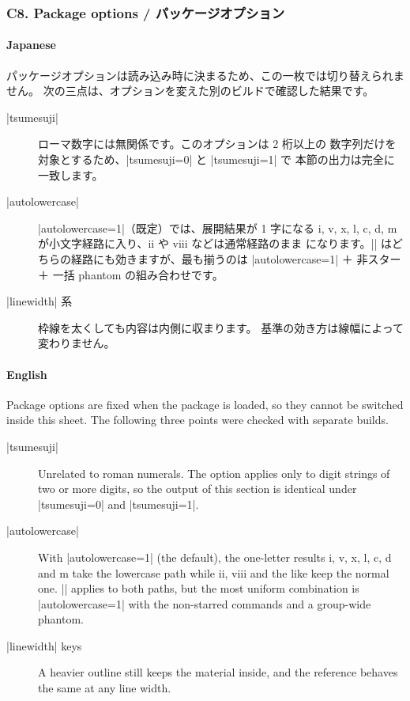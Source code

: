 \documentclass[luatex,fontsize=8pt,paper=b5,twoside]{jlreq}%
\begin{document}
\subsubsection*{C8. Package options / パッケージオプション}
\paragraph{Japanese}
パッケージオプションは読み込み時に決まるため、この一枚では切り替えられません。
次の三点は、オプションを変えた別のビルドで確認した結果です。

\begin{description}
  \item[\KKverb|tsumesuji|] ローマ数字には無関係です。このオプションは 2 桁以上の
  数字列だけを対象とするため、\KKverb|tsumesuji=0| と \KKverb|tsumesuji=1| で
  本節の出力は完全に一致します。
  \item[\KKverb|autolowercase|] \KKverb|autolowercase=1|（既定）では、展開結果が
  1 字になる i, v, x, l, c, d, m が小文字経路に入り、ii や viii などは通常経路のまま
  になります。\KKverb|\kksref| はどちらの経路にも効きますが、最も揃うのは
  \KKverb|autolowercase=1| ＋ 非スター ＋ 一括 phantom の組み合わせです。
  \item[\KKverb|linewidth| 系] 枠線を太くしても内容は内側に収まります。
  基準の効き方は線幅によって変わりません。
\end{description}

\paragraph{English}
Package options are fixed when the package is loaded, so they cannot be switched
inside this sheet. The following three points were checked with separate builds.

\begin{description}
  \item[\KKverb|tsumesuji|] Unrelated to roman numerals. The option applies only to
  digit strings of two or more digits, so the output of this section is identical
  under \KKverb|tsumesuji=0| and \KKverb|tsumesuji=1|.
  \item[\KKverb|autolowercase|] With \KKverb|autolowercase=1| (the default), the
  one-letter results i, v, x, l, c, d and m take the lowercase path while ii,
  viii and the like keep the normal one. \KKverb|\kksref| applies to both paths,
  but the most uniform combination is \KKverb|autolowercase=1| with the
  non-starred commands and a group-wide phantom.
  \item[\KKverb|linewidth| keys] A heavier outline still keeps the material
  inside, and the reference behaves the same at any line width.
\end{description}
\end{document}
